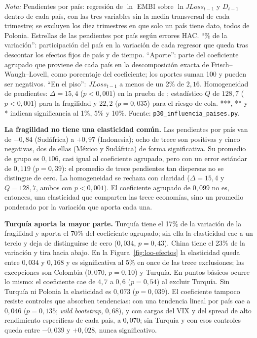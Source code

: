 \begin{table}[htbp]
\par\smallskip\parbox{0.95\linewidth}{\footnotesize \textit{Nota:} Pendientes por país: regresión de $\ln$ EMBI sobre $\ln JLoss_{t-1}$ y $D_{t-1}$ dentro de cada país, con las tres variables sin la media transversal de cada trimestre; se excluyen los diez trimestres en que solo un país tiene dato, todos de Polonia. Estrellas de las pendientes por país según errores HAC. ``\% de la variación'': participación del país en la variación de cada regresor que queda tras descontar los efectos fijos de país y de tiempo. ``Aporte'': parte del coeficiente agrupado que proviene de cada país en la descomposición exacta de Frisch--Waugh--Lovell, como porcentaje del coeficiente; los aportes suman 100 y pueden ser negativos. ``En el piso'': $JLoss_{t-1}$ a menos de un 2\% de $2{,}16$. Homogeneidad de pendientes: $\Delta=15{,}4$ ($p<0{,}001$) en la prueba de \citet{PesaranYamagata2008}; estadístico $Q$ de $128{,}7$ ($p<0{,}001$) para la fragilidad y $22{,}2$ ($p=0{,}035$) para el riesgo de cola. ***, ** y * indican significancia al 1\%, 5\% y 10\%. Fuente: \texttt{p30\_influencia\_paises.py}.}
\end{table}

\textbf{La fragilidad no tiene una elasticidad común.} Las pendientes por país van de $-0{,}84$ (Sudáfrica) a $+0{,}97$ (Indonesia); ocho de trece son positivas y cinco negativas, dos de ellas (México y Sudáfrica) de forma significativa. Su promedio de grupo es $0{,}106$, casi igual al coeficiente agrupado, pero con un error estándar de $0{,}119$ ($p=0{,}39$): el promedio de trece pendientes tan dispersas no se distingue de cero. La homogeneidad se rechaza con claridad ($\Delta=15{,}4$ y $Q=128{,}7$, ambos con $p<0{,}001$). El coeficiente agrupado de $0{,}099$ no es, entonces, una elasticidad que comparten las trece economías, sino un promedio ponderado por la variación que aporta cada una.

\textbf{Turquía aporta la mayor parte.} Turquía tiene el 17\% de la variación de la fragilidad y aporta el 70\% del coeficiente agrupado; sin ella la elasticidad cae a un tercio y deja de distinguirse de cero ($0{,}034$, $p=0{,}43$). China tiene el 23\% de la variación y tira hacia abajo. En la Figura~\ref{fig:loo-efectos} la elasticidad queda entre $0{,}034$ y $0{,}168$ y es significativa al 5\% en once de las trece exclusiones; las excepciones son Colombia ($0{,}070$, $p=0{,}10$) y Turquía. En puntos básicos ocurre lo mismo: el coeficiente cae de $4{,}7$ a $0{,}6$ ($p=0{,}54$) al excluir Turquía. Sin Turquía ni Polonia la elasticidad es $0{,}073$ ($p=0{,}039$). El coeficiente tampoco resiste controles que absorben tendencias: con una tendencia lineal por país cae a $0{,}046$ ($p=0{,}135$; \textit{wild bootstrap}, $0{,}68$), y con cargas del VIX y del spread de alto rendimiento específicas de cada país, a $0{,}070$; sin Turquía y con esos controles queda entre $-0{,}039$ y $+0{,}028$, nunca significativo.

